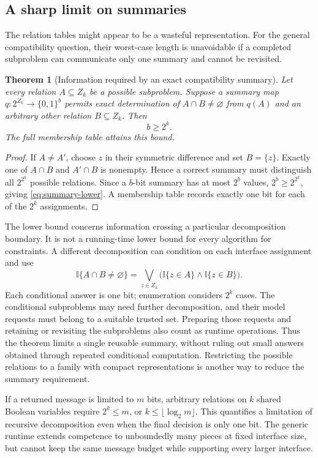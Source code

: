 \documentclass[11pt,twoside]{article}
\newcommand{\I}{\mathbb I}
\newtheorem{theorem}{Theorem}[section]
\theoremstyle{definition}
\theoremstyle{remark}
\begin{document}
\subsection{A sharp limit on summaries}

The relation tables might appear to be a wasteful representation. For the
general compatibility question, their worst-case length is unavoidable if
a completed subproblem can communicate only one summary and cannot be
revisited.

\begin{theorem}[Information required by an exact compatibility summary]
\label{thm:summary-lower}
Let every relation $A\subseteq Z_k$ be a possible subproblem. Suppose a
summary map $q:2^{Z_k}\to\{0,1\}^b$ permits exact determination of
$A\cap B\ne\varnothing$ from $q(A)$ and an arbitrary other relation
$B\subseteq Z_k$. Then
\begin{equation}
 b\geq 2^k.
 \label{eq:summary-lower}
\end{equation}
The full membership table attains this bound.
\end{theorem}
\begin{proof}
If $A\ne A'$, choose $z$ in their symmetric difference and set $B=\{z\}$.
Exactly one of $A\cap B$ and $A'\cap B$ is nonempty. Hence a correct
summary must distinguish all $2^{2^k}$ possible relations. Since a
$b$-bit summary has at most $2^b$ values,
$2^b\geq2^{2^k}$, giving \eqref{eq:summary-lower}. A membership table
records exactly one bit for each of the $2^k$ assignments.
\end{proof}

The lower bound concerns information crossing a particular decomposition
boundary. It is not a running-time lower bound for every algorithm for
constraints. A different decomposition can condition on each interface
assignment and use
\[
 \I\{A\cap B\ne\varnothing\}
 =\bigvee_{z\in Z_k}\bigl(\I\{z\in A\}\land\I\{z\in B\}\bigr).
\]
Each conditional answer is one bit; enumeration considers $2^k$ cases.
The conditional subproblems may need further decomposition, and their
model requests must belong to a suitable trusted set. Preparing those
requests and retaining or revisiting the subproblems also count as runtime
operations. Thus the theorem limits a single reusable summary, without
ruling out small answers obtained through repeated conditional computation.
Restricting the possible relations to a family with compact representations
is another way to reduce the summary requirement.

If a returned message is limited to $m$ bits, arbitrary relations on $k$
shared Boolean variables require $2^k\leq m$, or
$k\leq\lfloor\log_2 m\rfloor$. This quantifies a limitation of recursive
decomposition even when the final decision is only one bit. The generic
runtime extends competence to unboundedly many pieces at fixed interface
size, but cannot keep the same message budget while supporting every
larger interface.
\end{document}
